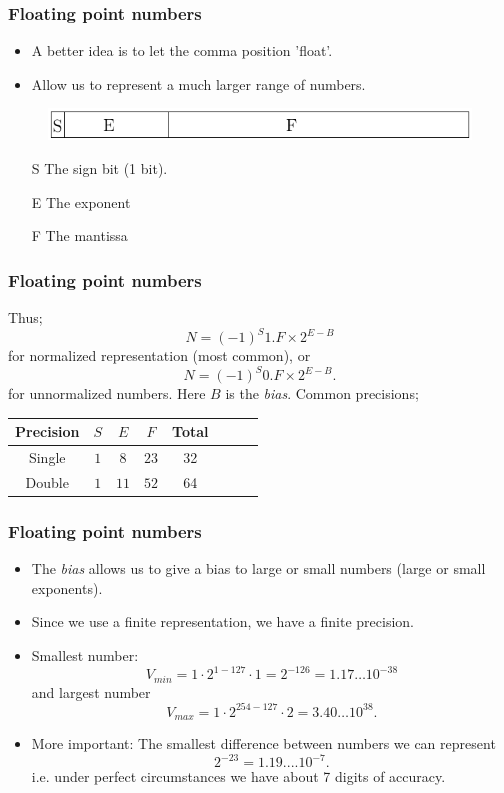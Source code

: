 \documentclass{beamer}
\begin{document}
\begin{frame}\frametitle{Floating point numbers}
  \begin{itemize}
    \item A better idea is to let the comma position 'float'.
    \item Allow us to represent a much larger range of numbers.
  \end{itemize}
  \begin{figure}[htbp]
  \begin{center}
    \includegraphics[scale=1]{../../notes/00.intro/ieee}
  \end{center}
  \end{figure}
  \begin{itemize}
    \item[S] The sign bit (1 bit).
    \item[E] The exponent
    \item[F] The mantissa
  \end{itemize}
\end{frame}

\begin{frame}\frametitle{Floating point numbers}
  Thus;
  \[
    N = (-1)^S 1.F \times 2^{E-B}
  \]
  for normalized representation (most common), or
  \[
    N = (-1)^S 0.F \times 2^{E-B}.
  \]
  for unnormalized numbers. Here $B$ is the \emph{bias}.
  Common precisions;
  \begin{center}
\begin{tabular}{|c|c|c|c|c|c|c|c|} \hline
Precision & $S$ & $E$ & $F$ & Total  
  \\ \hline
Single & $1$ & $8$ & $23$ & 32  
  \\ \hline
Double & $1$ & $11$ & $52$ & 64 
  \\ \hline
\end{tabular}
\end{center}
\end{frame}

\begin{frame}\frametitle{Floating point numbers}
  \begin{itemize}
    \item The \emph{bias} allows us to give a bias to large or small numbers (large or small exponents).
    \item Since we use a finite representation, we have a finite precision.
    \item Smallest number:
      \[
        V_{min} = 1\cdot 2^{1-127}\cdot 1 = 2^{-126} = 1.17\ldots 10^{-38}
      \]
      and largest number
      \[
        V_{max} = 1\cdot 2^{254-127}\cdot 2 = 3.40\ldots 10^{38}.
      \]
    \item More important: The smallest difference between numbers we can represent
      \[
        2^{-23} = 1.19....10^{-7}.
      \]
      i.e. under perfect circumstances we have about 7 digits of accuracy.
  \end{itemize}
\end{frame}
\end{document}
